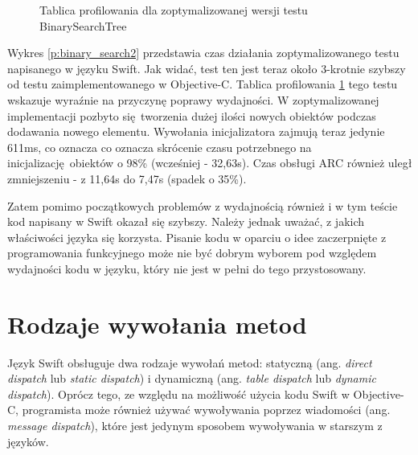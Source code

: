 \documentclass[mgr, shortabstract]{iithesis}
\newcommand{\ang}[1]{ang. \textit{#1}}
\begin{document}
\begin{figure}
    \caption{Tablica profilowania dla zoptymalizowanej wersji testu BinarySearchTree}
    \label{i:binary_search2}
\end{figure}

Wykres \ref{p:binary_search2} przedstawia czas działania zoptymalizowanego testu napisanego w języku Swift. Jak widać, test ten jest teraz około 3-krotnie szybszy od testu zaimplementowanego w Objective-C. Tablica profilowania \ref{i:binary_search2} tego testu wskazuje wyraźnie na przyczynę poprawy wydajności. W zoptymalizowanej implementacji pozbyto się tworzenia dużej ilości nowych obiektów podczas dodawania nowego elementu. Wywołania inicjalizatora zajmują teraz jedynie 611ms, co oznacza co oznacza skrócenie czasu potrzebnego na inicjalizację obiektów o 98\% (wcześniej - 32,63s). Czas obsługi ARC również uległ zmniejszeniu - z 11,64s do 7,47s (spadek o 35\%). 

Zatem pomimo początkowych problemów z wydajnością również i w tym teście kod napisany w Swift okazał się szybszy. Należy jednak uważać, z jakich właściwości języka się korzysta. Pisanie kodu w oparciu o idee zaczerpnięte z programowania funkcyjnego może nie być dobrym wyborem pod względem wydajności kodu w języku, który nie jest w pełni do tego przystosowany.

\section{Rodzaje wywołania metod}

Język Swift obsługuje dwa rodzaje wywołań metod: statyczną (\ang{direct dispatch} lub \textit{static dispatch}) i dynamiczną (\ang{table dispatch} lub \textit{dynamic dispatch}). Oprócz tego, ze względu na możliwość użycia kodu Swift w Objective-C, programista może również używać wywoływania poprzez wiadomości (\ang{message dispatch}), które jest jedynym sposobem wywoływania w starszym z języków.
\end{document}
